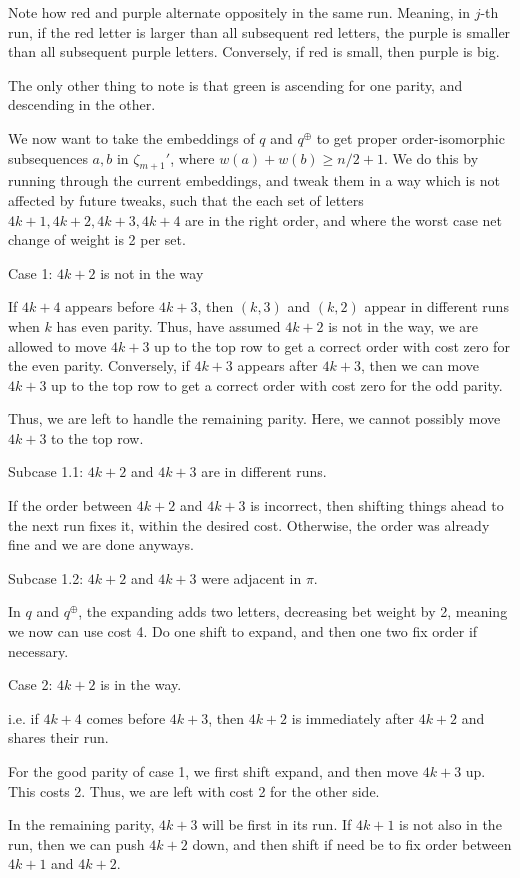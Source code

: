 \documentclass{article}
\begin{document}
Note how red and purple alternate oppositely in the same run. Meaning, in $j$-th run, if the red letter is larger than all subsequent red letters, the purple is smaller than all subsequent purple letters. Conversely, if red is small, then purple is big.

The only other thing to note is that green is ascending for one parity, and descending in the other.

We now want to take the embeddings of $q$ and $q^\oplus$ to get proper order-isomorphic subsequences $a,b$ in $\zeta_{m+1}'$, where $w(a)+w(b)\ge n/2 + 1$. We do this by running through the current embeddings, and tweak them in a way which is not affected by future tweaks, such that the each set of letters $4k+1,4k+2,4k+3,4k+4$ are in the right order, and where the worst case net change of weight is 2 per set.

Case 1: $4k+2$ is not in the way

If $4k+4$ appears before $4k+3$, then $(k,3)$ and $(k,2)$ appear in different runs when $k$ has even parity. Thus, have assumed $4k+2$ is not in the way, we are allowed to move $4k+3$ up to the top row to get a correct order with cost zero for the even parity. Conversely, if $4k+3$ appears after $4k+3$, then we can move $4k+3$ up to the top row to get a correct order with cost zero for the odd parity. 

Thus, we are left to handle the remaining parity. Here, we cannot possibly move $4k+3$ to the top row. 


Subcase 1.1: $4k+2$ and $4k+3$ are in different runs.

If the order between $4k+2$ and $4k+3$ is incorrect, then shifting things ahead to the next run fixes it, within the desired cost. Otherwise, the order was already fine and we are done anyways.

Subcase 1.2: $4k+2$ and $4k+3$ were adjacent in $\pi$.

In $q$ and $q^\oplus$, the expanding adds two letters, decreasing bet weight by 2, meaning we now can use cost 4. Do one shift to expand, and then one two fix order if necessary.

Case 2: $4k+2$ is in the way.

i.e. if $4k+4$ comes before $4k+3$, then $4k+2$ is immediately after $4k+2$ and shares their run.

For the good parity of case 1, we first shift expand, and then move $4k+3$ up. This costs 2. Thus, we are left with cost 2 for the other side.

In the remaining parity, $4k+3$ will be first in its run. If $4k+1$ is not also in the run, then we can push $4k+2$ down, and then shift if need be to fix order between $4k+1$ and $4k+2$.
\end{document}
